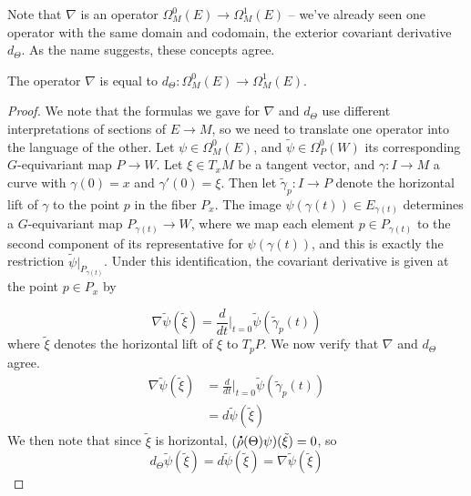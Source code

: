 %
Note that $\nabla$ is an operator $\Omega_M^0(E) \to \Omega^1_M(E)$ --
we've already seen one operator with the same domain and codomain, the
exterior covariant derivative $d_\Theta$. As the name suggests, these
concepts agree.
%
\begin{prop}
The operator $\nabla$ is equal to $d_\Theta : \Omega_M^0(E) \to \Omega_M^1(E)$.
\end{prop}
%
\begin{proof} %
We note that the formulas we gave for $\nabla$ and $d_\Theta$ use different
interpretations of sections of $E \to M$, so we need to translate one
operator into the language of the other. Let $\psi \in \Omega^0_M(E)$,
and $\tilde{\psi} \in \Omega^0_P(W)$ its corresponding $G$-equivariant map
$P \to W$. Let $\xi \in T_xM$ be a tangent vector, and $\gamma : I \to M$
a curve with $\gamma(0) = x$ and $\gamma'(0) = \xi$. Then let
$\tilde{\gamma}_p : I \to P$ denote the horizontal lift of $\gamma$ to the point
$p$ in the fiber $P_x$. The image $\psi(\gamma(t)) \in E_{\gamma(t)}$ determines
a $G$-equivariant map $P_{\gamma(t)} \to W$, where we map each element
$p \in P_{\gamma(t)}$ to the second component of its representative for
$\psi(\gamma(t))$, and this is exactly the restriction
$\tilde{\psi}\vert_{P_{\gamma(t)}}$. Under this identification, the
covariant derivative is given at the point $p \in P_x$ by

\[
\nabla\tilde{\psi}(\tilde{\xi})
= \frac{d}{dt}\bigg\vert_{t=0} \tilde{\psi}(\tilde{\gamma}_p(t))
\]
where $\tilde{\xi}$ denotes the horizontal lift of $\xi$ to $T_pP$.
We now verify that $\nabla$ and $d_\Theta$ agree.
\begin{align*}
\nabla\tilde{\psi}(\tilde{\xi})
&= \frac{d}{dt}\bigg\vert_{t=0} \tilde{\psi}(\tilde{\gamma}_p(t)) \\
&= d\tilde{\psi}(\tilde{\xi})
\end{align*}
We then note that since $\tilde{\xi}$ is horizontal,
$(\accentset{\mbox{\large\bfseries .}}{\rho}(\Theta)\psi)(\tilde{\xi}) = 0$, so
\[
d_\Theta\tilde{\psi}(\tilde{\xi}) = d\tilde{\psi}(\tilde{\xi})
= \nabla\tilde{\psi}(\tilde{\xi})
\]
\end{proof}
%
















